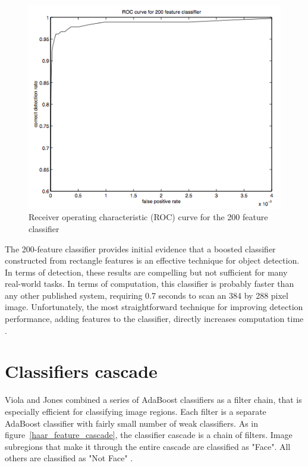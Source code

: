 \begin{figure}[!h]
\begin{center}
\noindent \includegraphics[scale=0.8]{figures/haar_feature_example_result} 
\newline
\caption{Receiver operating characteristic (ROC) curve for the 200 feature classifier}
\label{haar_feature_example_result}
\end{center} 
\end{figure}

\noindent The 200-feature classifier provides initial evidence that a boosted classifier constructed from rectangle features is an effective technique for object detection. In terms of detection, these results are compelling but not sufficient for many real-world tasks. In terms of computation, this classifier is probably faster than any other published system, requiring 0.7 seconds to scan an 384 by 288 pixel image. Unfortunately, the most straightforward technique for improving detection performance, adding features to the classifier, directly increases computation time \cite{VIO01}.
\newline

\section{Classifiers cascade}

\vspace{\baselineskip}
\noindent Viola and Jones combined a series of AdaBoost classifiers as a filter chain, that is especially efficient for classifying image regions. Each filter is a separate AdaBoost classifier with fairly small number of weak classifiers. As in figure~\ref{haar_feature_cascade}, the classifier cascade is a chain of filters. Image subregions that make it through the entire cascade are classified as "Face". All others are classified as "Not Face" \cite{HEW07}.
\newline

